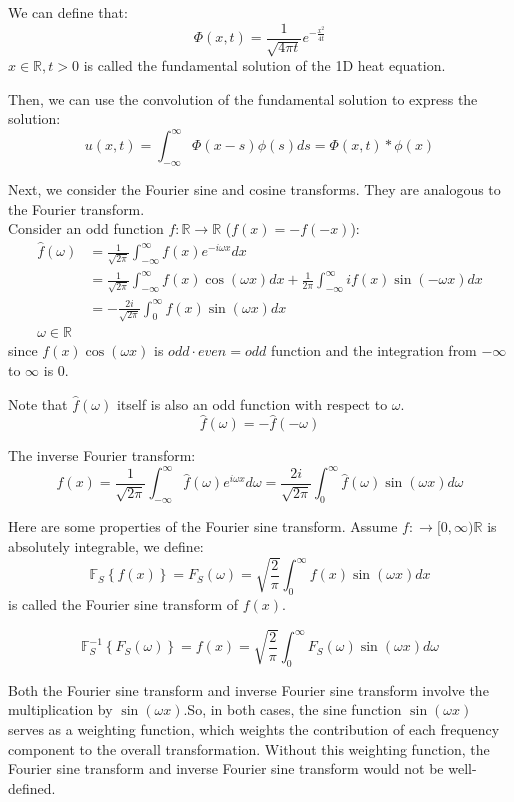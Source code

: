 \documentclass[12pt]{article} %
\begin{document}
We can define that:
$$
\Phi (x, t) = \frac{1}{\sqrt{4 \pi t}} e^{-\frac{x^2}{4t}}
$$ $x\in \mathbb{R}, t > 0$ is called the fundamental solution of the 1D heat equation. \par
Then, we can use the convolution of the fundamental solution to express the solution:
$$
u(x, t) = \int_{-\infty}^{\infty} \Phi(x-s) \phi(s) ds = \Phi (x, t) * \phi(x)
$$\par
Next, we consider the Fourier sine and cosine transforms. They are analogous to the Fourier transform. \\
Consider an odd function $f : \mathbb{R} \to \mathbb{R}$ ($f(x) =- f(-x)$):
\begin{align*}
\hat{f}(\omega) &= \frac{ 1}{\sqrt{2 \pi}} \int_{-\infty}^{\infty} f(x) e^{-i \omega x} dx \\
& =  \frac{ 1}{\sqrt{2 \pi}}\int_{-\infty}^{\infty} f(x) \cos(\omega x) dx +  \frac{ 1}{2 \pi}\int_{-\infty}^{\infty} i f(x) \sin(-\omega x) dx\\
& = - \frac{ 2i}{\sqrt{2 \pi}}\int_{0}^{\infty} f(x) \sin(\omega x) dx \\ \omega \in \mathbb{R}
\end{align*} since
$f(x) \cos(\omega x)$ is $odd\cdot even = odd$ function and the integration from $ -\infty$ to $\infty$ is 0. \par
Note that $\hat{f}(\omega)$ itself is also an odd function with respect to $\omega$. 
$$
\hat{f}(\omega) = - \hat{f}(-\omega)
$$\par
The inverse Fourier transform:
$$
f(x) =  \frac{ 1}{\sqrt{2 \pi}} \int_{-\infty}^{\infty} \hat{f}(\omega) e^{i \omega x} d \omega = \frac{ 2i}{\sqrt{2 \pi}}\int_{0}^{\infty}\hat{f}(\omega) \sin(\omega x) d \omega
$$\par
Here are some properties of the Fourier sine transform. Assume $f: \to [0, \infty) \mathbb{R} $ is absolutely integrable, we define:
$$
\mathbb{F}_{S}\left\{ f(x) \right\} = F_{S}(\omega) = \sqrt{\frac{2}{\pi}} \int_{0}^{\infty} f(x) \sin (\omega x) dx
$$is called the Fourier sine transform of $f (x)$.\par
$$
\mathbb{F}_{S}^{-1}\left\{ F_{S}(\omega) \right\} =f(x) =  \sqrt{\frac{2}{\pi}} \int_{0}^{\infty} F_{S}(\omega) \sin(\omega x) d \omega
$$\par
 Both the Fourier sine transform and inverse Fourier sine transform involve the multiplication by $\sin(\omega x)$.So, in both cases, the sine function $\sin(\omega x)$ serves as a weighting function, which weights the contribution of each frequency component to the overall transformation. Without this weighting function, the Fourier sine transform and inverse Fourier sine transform would not be well-defined.\par
\end{document}
